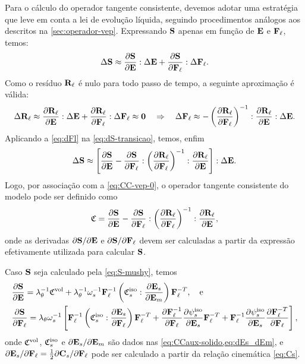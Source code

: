 \documentclass[Tese.tex]{subfiles}
\begin{document}
Para o cálculo do operador tangente consistente, devemos adotar uma estratégia que leve em conta a lei de evolução líquida, seguindo procedimentos análogos aos descritos na \cref{sec:operador-vep}. Expressando $\S$ apenas em função de $\E$ e $\Fl$, temos:
\begin{equation}\label{eq:dS-transicao}
\Delta\S \approx \dfrac{\partial\S}{\partial\E}:\Delta\E + \dfrac{\partial\S}{\partial\Fl}:\Delta\Fl.
\end{equation}
Como o resíduo $\Rl$ é nulo para todo passo de tempo, a seguinte aproximação é válida:
\begin{equation}\label{eq:dFl}
\Delta\Rl \approx \dfrac{\partial\Rl}{\partial\E}:\Delta\E + \dfrac{\partial\Rl}{\partial\Fl}:\Delta\Fl \approx \mathbf{0} \quad \Rightarrow\quad \Delta\Fl \approx -\left(\dfrac{\partial\Rl}{\partial\Fl}\right)^{-1}:\dfrac{\partial\Rl}{\partial\E}:\Delta\E.
\end{equation}
Aplicando a \cref{eq:dFl} na \cref{eq:dS-transicao}, temos, enfim
\begin{equation}
\Delta\S \approx \left[\dfrac{\partial\S}{\partial\E} - \dfrac{\partial\S}{\partial\Fl}:\left(\dfrac{\partial\Rl}{\partial\Fl}\right)^{-1}:\dfrac{\partial\Rl}{\partial\E}\right]:\Delta\E.
\end{equation}
Logo, por associação com a \cref{eq:CC-vep-0}, o operador tangente consistente do modelo pode ser definido como
\begin{equation}\label{eq:CC-transicao}
\CC = \dfrac{\partial\S}{\partial\E} - \dfrac{\partial\S}{\partial\Fl}:\left(\dfrac{\partial\Rl}{\partial\Fl}\right)^{-1}:\dfrac{\partial\Rl}{\partial\E},
\end{equation}
onde as derivadas ${\partial\S}/{\partial\E}$ e ${\partial\S}/{\partial\Fl}$ devem ser calculadas a partir da expressão efetivamente utilizada para calcular $\S$. 

Caso $\S$ seja calculado pela \cref{eq:S-mushy}, temos
\begin{align}
&\dfrac{\partial\S}{\partial\E} = \alongTermico^{-1}\CCvol + \alongTermico^{-1}\solidMultiplier^{-1}\Fl^{-1}\left(\CCs:\dfrac{\partial\Es}{\partial\Em}\right)\Fl^{-T}, \text{\quad e} \label{eq:dS_dE1}\\
&\dfrac{\partial\S}{\partial\Fl} = \alongTermico\solidMultiplier^{-1}\left[\Fl^{-1}\left(\CCs:\dfrac{\partial\Es}{\partial\Fl}\right)\Fl^{-T} + \dfrac{\partial\Fl^{-1}}{\partial\Fl}\dfrac{\partial\helmholtzs}{\partial\Es}\Fl^{-T} + \Fl^{-1}\dfrac{\partial\helmholtzs}{\partial\Es}\dfrac{\partial\Fl^{-T}}{\partial\Fl}\right],\label{eq:dS_dFl1}
\end{align}
onde $\CCvol$, $\CCs$ e ${\partial\Es}/{\partial\Em}$ são dados nas \cref{eq:CCaux-solido,eq:dEs_dEm}, e ${\partial\Es}/{\partial\Fl} = \frac{1}{2}{\partial\Cs}/{\partial\Fl}$ pode ser calculado a partir da relação cinemática \eqref{eq:Cs}. 
\end{document}
